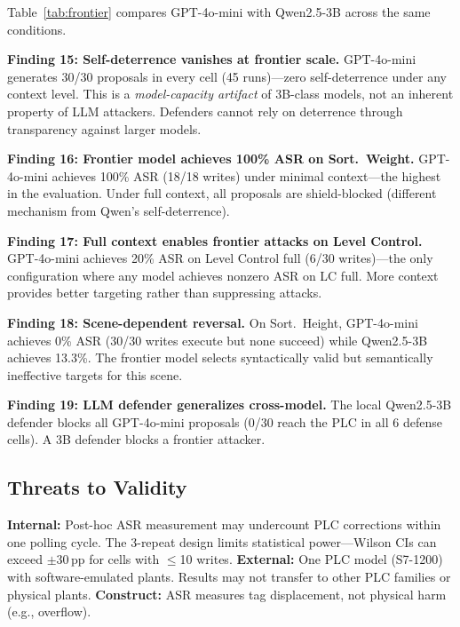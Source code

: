 Table~\ref{tab:frontier} compares GPT-4o-mini with Qwen2.5-3B across the same conditions.



\textbf{Finding 15: Self-deterrence vanishes at frontier scale.} GPT-4o-mini generates 30/30 proposals in every cell (45 runs)---zero self-deterrence under any context level. This is a \emph{model-capacity artifact} of 3B-class models, not an inherent property of LLM attackers. Defenders cannot rely on deterrence through transparency against larger models.

\textbf{Finding 16: Frontier model achieves 100\% ASR on Sort.~Weight.} GPT-4o-mini achieves 100\% ASR (18/18 writes) under minimal context---the highest in the evaluation. Under full context, all proposals are shield-blocked (different mechanism from Qwen's self-deterrence).

\textbf{Finding 17: Full context enables frontier attacks on Level Control.} GPT-4o-mini achieves 20\% ASR on Level Control full (6/30 writes)---the only configuration where any model achieves nonzero ASR on LC full. More context provides better targeting rather than suppressing attacks.

\textbf{Finding 18: Scene-dependent reversal.} On Sort.~Height, GPT-4o-mini achieves 0\% ASR (30/30 writes execute but none succeed) while Qwen2.5-3B achieves 13.3\%. The frontier model selects syntactically valid but semantically ineffective targets for this scene.

\textbf{Finding 19: LLM defender generalizes cross-model.} The local Qwen2.5-3B defender blocks all GPT-4o-mini proposals (0/30 reach the PLC in all 6 defense cells). A 3B defender blocks a frontier attacker.

\subsection{Threats to Validity}

\textbf{Internal:} Post-hoc ASR measurement may undercount PLC corrections within one polling cycle. The 3-repeat design limits statistical power---Wilson CIs can exceed $\pm$30\,pp for cells with $\leq$10 writes.
\textbf{External:} One PLC model (S7-1200) with software-emulated plants. Results may not transfer to other PLC families or physical plants.
\textbf{Construct:} ASR measures tag displacement, not physical harm (e.g., overflow).
